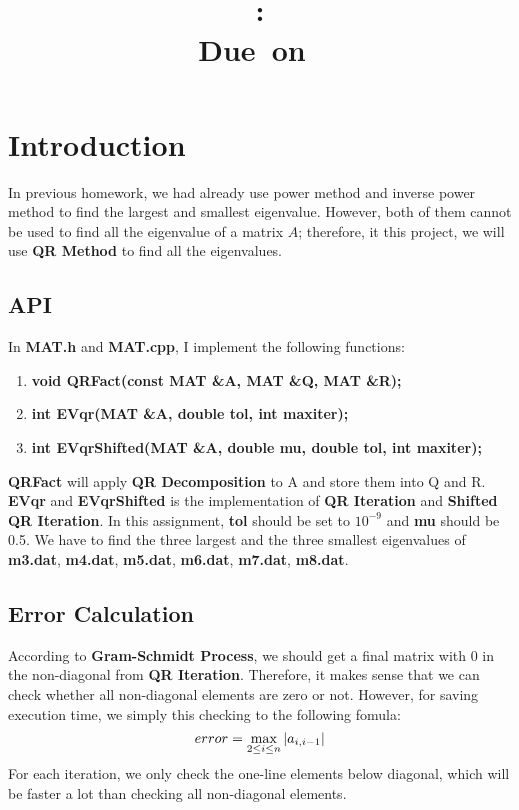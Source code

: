 \documentclass{article}
\title{
    \vspace{2in}
    \textmd{\textbf{\hmwkClass}}\\
    \textmd{\textbf{\hmwkID: \hmwkTitle}} \\
    \normalsize\vspace{0.1in}\small{Due\ on\ \hmwkDueDate}\\
    \vspace{3in}
}
\author{\textbf{\hmwkAuthorName}}
\date{} %
\DeclarePairedDelimiter\abs{\lvert}{\rvert}%
\begin{document}
\maketitle
\newpage

\section{Introduction}
In previous homework, we had already use power method and inverse power method to find the largest and smallest eigenvalue.
However, both of them cannot be used to find all the eigenvalue of a matrix $A$; therefore, it this project, we will use
\textbf{QR Method} to find all the eigenvalues.

\subsection{API}
In \textbf{MAT.h} and \textbf{MAT.cpp}, I implement the following functions:
\begin{enumerate}
    \item \textbf{void QRFact(const MAT \&A, MAT \&Q, MAT \&R);}
    \item \textbf{int EVqr(MAT \&A, double tol, int maxiter);}
    \item \textbf{int EVqrShifted(MAT \&A, double mu, double tol, int maxiter);}
\end{enumerate}
\textbf{QRFact} will apply \textbf{QR Decomposition} to A and store them into Q and R. \textbf{EVqr} and \textbf{EVqrShifted}
is the implementation of \textbf{QR Iteration} and \textbf{Shifted QR Iteration}. In this assignment, \textbf{tol} should be set to
$10^{-9}$ and \textbf{mu} should be 0.5. We have to find the three largest and the three smallest eigenvalues of 
\textbf{m3.dat}, \textbf{m4.dat}, \textbf{m5.dat}, \textbf{m6.dat}, \textbf{m7.dat}, \textbf{m8.dat}.

\subsection{Error Calculation}
According to \textbf{Gram-Schmidt Process}, we should get a final matrix with 0 in the non-diagonal from \textbf{QR Iteration}.
Therefore, it makes sense that we can check whether all non-diagonal elements are zero or not. However, for saving execution
time, we simply this checking to the following fomula:
$$
    error = \max_{2 \leq i \leq n}{\abs{a_{i,i-1}}}
$$
For each iteration, we only check the one-line elements below diagonal, which will be faster a lot than checking all
non-diagonal elements.
\end{document}
